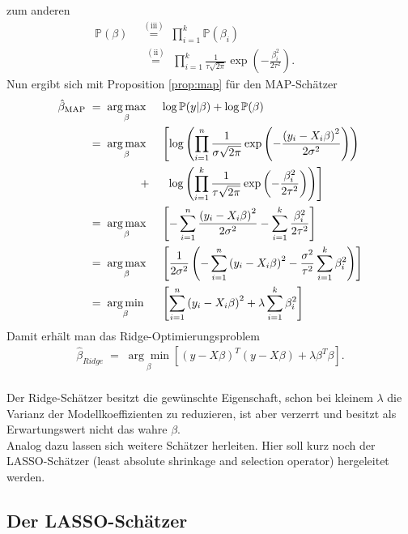 zum anderen
\begin{align*}
	\mathbb{P}(\beta)&\;\overset{(\text{iii})}{=}\;\prod_{i=1}^{k}\mathbb{P}(\beta_i)\\
	&\,\,\:\!\overset{(\text{ii})}{=}\:\,\prod_{i=1}^{k}\frac{1}{\tau\sqrt{2\pi}}\exp\left(-\frac{\beta_i^2}{2\tau^2}\right).\qquad\;\;\:
\end{align*}
Nun ergibt sich mit Proposition \autoref{prop:map} für den MAP-Schätzer
\begin{alignat*}{2}
	\hat{\beta}_{\text{MAP}}&\;=\;\underset{\beta}{\arg\max}&& \log\mathbb{P}(y\vert \beta) + \log \mathbb{P}(\beta) \\
	&\;=\;\underset{\beta}{\arg\max}&&\left[\log\left(\prod_{i=1}^{n}\frac{1}{\sigma\sqrt{2\pi}}\exp\left(-\frac{\left(y_i-X_i\beta\right)^2}{2\sigma^2}\right)\right)\right.\\	&\hspace{1,7cm}+&&\:\:\left.\log\left(\prod_{i=1}^{k}\frac{1}{\tau\sqrt{2\pi}}\exp\left(-\frac{\beta_i^2}{2\tau^2}\right)\right)\right]\\
	&\;=\;\underset{\beta}{\arg\max} && \left[-\sum_{i=1}^{n}\frac{\left(y_i-X_i\beta\right)^2}{2\sigma^2}-\sum_{i=1}^{k}\frac{\beta_i^2}{2\tau^2}\right]\\
	&\;=\;\underset{\beta}{\arg\max} && \left[\frac{1}{2\sigma^2}\left(-\sum_{i=1}^{n}\left(y_i-X_i\beta\right)^2-\frac{\sigma^2}{\tau^2}\sum_{i=1}^{k}\beta_i^2\right)\right]\\
	&\;=\;\underset{\beta}{\arg\min} && \left[\sum_{i=1}^{n}\left(y_i-X_i\beta\right)^2+\lambda\sum_{i=1}^{k}\beta_i^2\right]\\
\end{alignat*}
Damit erhält man das Ridge-Optimierungsproblem
\begin{align*}
	\hat{\beta}_{Ridge}\;=\;\underset{\beta}{\arg\min}\left[\left(y-X\beta\right)^T\left(y-X\beta\right)+\lambda \beta^T\beta\right].
\end{align*}
\hfill\\ Der Ridge-Schätzer besitzt die gewünschte Eigenschaft, schon bei kleinem \(\lambda\) die Varianz der Modellkoeffizienten zu reduzieren, ist aber verzerrt und besitzt als Erwartungswert nicht das wahre \(\beta\). \\
Analog dazu lassen sich weitere Schätzer herleiten. Hier soll kurz noch der LASSO-Schätzer (least absolute shrinkage and selection operator) hergeleitet werden.

\subsection{Der LASSO-Schätzer}


